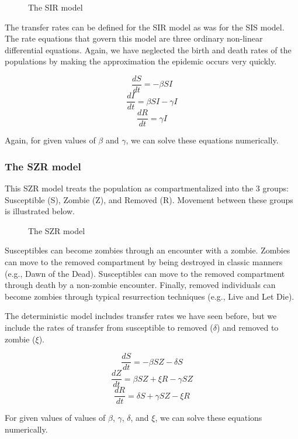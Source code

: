 \begin{figure}
\centering
{}
\caption{The SIR model}
\end{figure}

The transfer rates can be defined for the SIR model as was for the SIS
model. The rate equations that govern this model are three ordinary
non-linear differential equations. Again, we have neglected the birth
and death rates of the populations by making the approximation the
epidemic occurs very quickly.

\[\dfrac{dS}{dt} = -\beta S I\]
\[\dfrac{dI}{dt} = \beta S I - \gamma I\] \[\dfrac{dR}{dt} = \gamma I\]

Again, for given values of \(\beta\) and \(\gamma\), we can solve these
equations numerically.

\subsubsection{The SZR model}\label{the-szr-model}

This SZR model treats the population as compartmentalized into the 3
groups: Susceptible (S), Zombie (Z), and Removed (R). Movement between
these groups is illustrated below.

\begin{figure}
\centering
{}
\caption{The SZR model}
\end{figure}

Susceptibles can become zombies through an encounter with a zombie.
Zombies can move to the removed compartment by being destroyed in
classic manners (e.g., Dawn of the Dead). Susceptibles can move to the
removed compartment through death by a non-zombie encounter. Finally,
removed individuals can become zombies through typical resurrection
techniques (e.g., Live and Let Die).

The deterministic model includes transfer rates we have seen before, but
we include the rates of transfer from susceptible to removed
(\(\delta\)) and removed to zombie (\(\xi\)).

\[\dfrac{dS}{dt} = - \beta S Z - \delta S\]
\[\dfrac{dZ}{dt} = \beta S Z + \xi R - \gamma S Z\]
\[\dfrac{dR}{dt} = \delta S +\gamma SZ - \xi R\]

For given values of values of \(\beta\), \(\gamma\), \(\delta\), and
\(\xi\), we can solve these equations numerically.

